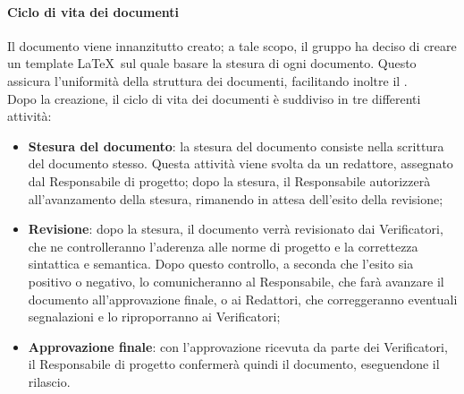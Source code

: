 \documentclass[../norme-di-progetto.tex]{subfiles}
\begin{document}
\paragraph{Ciclo di vita dei documenti}
Il documento viene innanzitutto creato; a tale scopo, il gruppo ha deciso di creare un template \LaTeX\ sul quale basare la stesura di ogni documento. Questo assicura l'uniformità della struttura dei documenti, facilitando inoltre il . \\
Dopo la creazione, il ciclo di vita dei documenti è suddiviso in tre differenti attività:
\begin{itemize}
  \item \textbf{Stesura del documento}: la stesura del documento consiste nella scrittura del documento stesso. Questa attività viene svolta da un redattore, assegnato dal Responsabile di progetto; dopo la stesura, il Responsabile autorizzerà all'avanzamento della stesura, rimanendo in attesa dell'esito della revisione;
  \item \textbf{Revisione}: dopo la stesura, il documento verrà revisionato dai Verificatori, che ne controlleranno l'aderenza alle norme di progetto e la correttezza sintattica e semantica. Dopo questo controllo, a seconda che l'esito sia positivo o negativo, lo comunicheranno al Responsabile, che farà avanzare il documento all'approvazione finale, o ai Redattori, che correggeranno eventuali segnalazioni e lo riproporranno ai Verificatori;
  \item \textbf{Approvazione finale}: con l'approvazione ricevuta da parte dei Verificatori, il Responsabile di progetto confermerà quindi il documento, eseguendone il rilascio.
\end{itemize}
\end{document}
